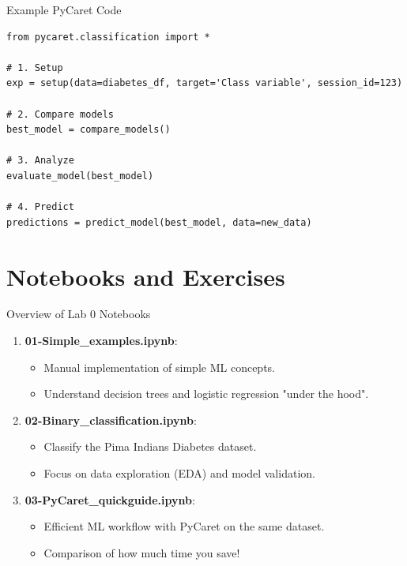 \documentclass[aspectratio=169]{beamer}
\begin{document}
\begin{frame}[fragile]{Example PyCaret Code}
    \begin{verbatim}
from pycaret.classification import *

# 1. Setup
exp = setup(data=diabetes_df, target='Class variable', session_id=123)

# 2. Compare models
best_model = compare_models()

# 3. Analyze
evaluate_model(best_model)

# 4. Predict
predictions = predict_model(best_model, data=new_data)
    \end{verbatim}
\end{frame}

\section{Notebooks and Exercises}
\begin{frame}{Overview of Lab 0 Notebooks}
    \begin{enumerate}
        \item \textbf{01-Simple\_examples.ipynb}:
        \begin{itemize}
            \item Manual implementation of simple ML concepts.
            \item Understand decision trees and logistic regression "under the hood".
        \end{itemize}
        
        \item \textbf{02-Binary\_classification.ipynb}:
        \begin{itemize}
            \item Classify the Pima Indians Diabetes dataset.
            \item Focus on data exploration (EDA) and model validation.
        \end{itemize}
        
        \item \textbf{03-PyCaret\_quickguide.ipynb}:
        \begin{itemize}
            \item Efficient ML workflow with PyCaret on the same dataset.
            \item Comparison of how much time you save!
        \end{itemize}
    \end{enumerate}
\end{frame}
\end{document}
